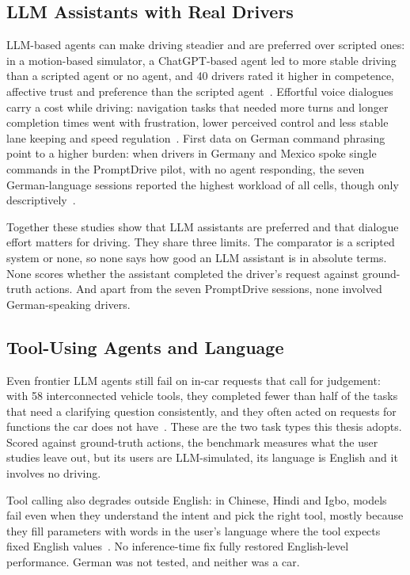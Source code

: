 \documentclass[
    a4paper,
    11pt,
    DIV=11,
    bigheadings,
    idxtotoc,
    listof=totoc,
    bibtotoc,
    halfparskip,
    cleardoubleempty,
    openright,
    oneside
]{scrartcl}
\begin{document}
\subsection{LLM Assistants with Real Drivers}

LLM-based agents can make driving steadier and are preferred over scripted ones: in a motion-based simulator, a ChatGPT-based agent led to more stable driving than a scripted agent or no agent, and 40 drivers rated it higher in competence, affective trust and preference than the scripted agent~\cite{Choe26ChatGPT}.
Effortful voice dialogues carry a cost while driving: navigation tasks that needed more turns and longer completion times went with frustration, lower perceived control and less stable lane keeping and speed regulation~\cite{Liu26Affective}.
First data on German command phrasing point to a higher burden: when drivers in Germany and Mexico spoke single commands in the PromptDrive pilot, with no agent responding, the seven German-language sessions reported the highest workload of all cells, though only descriptively~\cite{Alvarez26Do}.

Together these studies show that LLM assistants are preferred and that dialogue effort matters for driving.
They share three limits.
The comparator is a scripted system or none, so none says how good an LLM assistant is in absolute terms.
None scores whether the assistant completed the driver's request against ground-truth actions.
And apart from the seven PromptDrive sessions, none involved German-speaking drivers.

\subsection{Tool-Using Agents and Language}

Even frontier LLM agents still fail on in-car requests that call for judgement: with 58 interconnected vehicle tools, they completed fewer than half of the tasks that need a clarifying question consistently, and they often acted on requests for functions the car does not have~\cite{Kirmayr26CAR}.
These are the two task types this thesis adopts.
Scored against ground-truth actions, the benchmark measures what the user studies leave out, but its users are LLM-simulated, its language is English and it involves no driving.

Tool calling also degrades outside English: in Chinese, Hindi and Igbo, models fail even when they understand the intent and pick the right tool, mostly because they fill parameters with words in the user's language where the tool expects fixed English values~\cite{Luo26Lost}.
No inference-time fix fully restored English-level performance.
German was not tested, and neither was a car.
\end{document}
